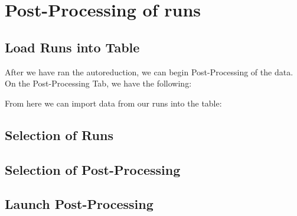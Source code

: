 \section{Post-Processing of runs}
\subsection{Load Runs into Table}

After we have ran the autoreduction, we can begin Post-Processing of the data. On the Post-Processing Tab, we have the following:

\noindent{}

From here we can import data from our runs into the table:

\noindent{}

\subsection{Selection of Runs}
\subsection{Selection of Post-Processing}
\subsection{Launch Post-Processing}
